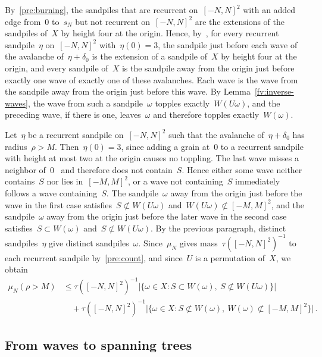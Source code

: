 \documentclass[11pt]{amsart}
\numberwithin{equation}{section}
\begin{document}
By~\eqref{pre:burning}, the sandpiles that are recurrent on~$[-N,N]^2$ with an added edge from~$0$ to~$s_N$ but not recurrent on~$[-N,N]^2$ are the extensions of the sandpiles of~$X$ by height four at the origin. Hence, by~\citet[Definition~1 and Lemma~2.7]{BhupatirajuHansonJarai2017}, for every recurrent sandpile~$\eta$ on~$[-N,N]^2$ with~$\eta(0)=3$, the sandpile just before each wave of the avalanche of~$\eta+\delta_0$ is the extension of a sandpile of~$X$ by height four at the origin, and every sandpile of~$X$ is the sandpile away from the origin just before exactly one wave of exactly one of these avalanches. Each wave is the wave from the sandpile away from the origin just before this wave. By Lemma~\ref{fv:inverse-waves}, the wave from such a sandpile~$\omega$ topples exactly~$W(U\omega)$, and the preceding wave, if there is one, leaves~$\omega$ and therefore topples exactly~$W(\omega)$.

Let~$\eta$ be a recurrent sandpile on~$[-N,N]^2$ such that the avalanche of~$\eta+\delta_0$ has radius~$\rho>M$. Then~$\eta(0)=3$, since adding a grain at~$0$ to a recurrent sandpile with height at most two at the origin causes no toppling. The last wave misses a neighbor of~$0$~\citep[Corollary~2.8]{BhupatirajuHansonJarai2017} and therefore does not contain~$S$. Hence either some wave neither contains~$S$ nor lies in~$[-M,M]^2$, or a wave not containing~$S$ immediately follows a wave containing~$S$. The sandpile~$\omega$ away from the origin just before the wave in the first case satisfies~$S\not\subset W(U\omega)$ and~$W(U\omega)\not\subset [-M,M]^2$, and the sandpile~$\omega$ away from the origin just before the later wave in the second case satisfies~$S\subset W(\omega)$ and~$S\not\subset W(U\omega)$. By the previous paragraph, distinct sandpiles~$\eta$ give distinct sandpiles~$\omega$. Since~$\mu_N$ gives mass~$\tau([-N,N]^2)^{-1}$ to each recurrent sandpile by~\eqref{pre:count}, and since~$U$ is a permutation of~$X$, we obtain
\begin{equation}\label{fv:excursion-union}
\begin{split}
\mu_N(\rho>M)&\leq\tau([-N,N]^2)^{-1}\bigl|\{\omega\in X:S\subset W(\omega),\ S\not\subset W(U\omega)\}\bigr|\\
&\quad+\tau([-N,N]^2)^{-1}\bigl|\{\omega\in X:S\not\subset W(\omega),\ W(\omega)\not\subset [-M,M]^2\}\bigr|\,.
\end{split}
\end{equation}

\subsection{From waves to spanning trees}\label{ssec:waves-to-trees}
\end{document}
